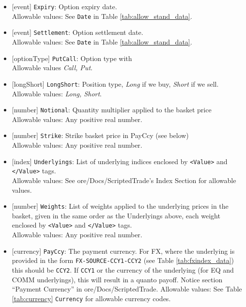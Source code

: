 \begin{itemize}
    \item{}[event] \lstinline!Expiry!: Option expiry date. \\
    Allowable values: See \lstinline!Date! in Table \ref{tab:allow_stand_data}.
    \item{}[event] \lstinline!Settlement!: Option settlement date. \\
    Allowable values: See \lstinline!Date! in Table \ref{tab:allow_stand_data}.
    \item{}[optionType] \lstinline!PutCall!: Option type with \\
          Allowable values \emph{Call, Put}.
    \item{}[longShort] \lstinline!LongShort!: Position type,
          {\em Long} if we buy, {\em Short} if we sell.\\
    Allowable values: \emph{Long, Short}.
     \item{}[number] \lstinline!Notional!: Quantity multiplier applied to the basket price \\
          Allowable values: Any positive real number.
     \item{}[number] \lstinline!Strike!: Strike basket price in PayCcy (see below) \\
          Allowable values: Any positive real number.
     \item{}[index] \lstinline!Underlyings!:
          List of underlying indices enclosed by {\tt <Value>} and {\tt </Value>} tags. \\
          Allowable values: See ore/Docs/ScriptedTrade's Index Section for allowable values.
    \item{}[number] \lstinline!Weights!: List of weights applied to the
      underlying prices in the basket, given in the same order as
      the Underlyings above, each weight enclosed by {\tt <Value>} and {\tt </Value>} tags.\\
      Allowable values: Any positive real number.
    \item{}[currency] \lstinline!PayCcy!: The payment currency. For FX, where the underlying is provided
    in the form \lstinline!FX-SOURCE-CCY1-CCY2! (see Table \ref{tab:fxindex_data}) this should
    be \lstinline!CCY2!. If \lstinline!CCY1! or the currency of the underlying (for EQ and
    COMM underlyings), this will result in a quanto payoff. Notice section ``Payment Currency'' in ore/Docs/ScriptedTrade.
      Allowable values: See Table \ref{tab:currency} \lstinline!Currency!
      for allowable currency codes.
\end{itemize}


